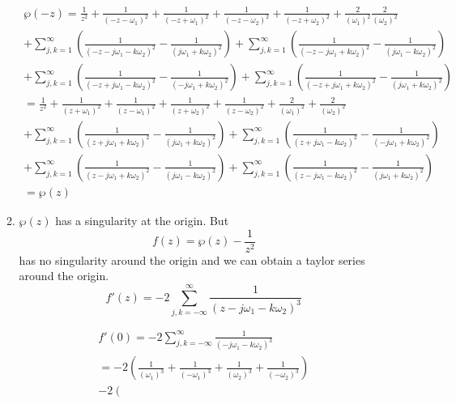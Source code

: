 \documentclass[a4paper]{article}
\begin{document}
\begin{enumerate}
\begin{enumerate}
		                         	\begin{center}             
                \begin{gather*}
   \wp(-z)		=\frac{1}{z^2}+ \frac{1}{(-z- \omega_1)^2}+ \frac{1}{(-z+ \omega_1)^2}+ \frac{1}{(-z- \omega_2)^2}+ \frac{1}{(-z+ \omega_2)^2}+ \frac{2}{( \omega_1)^2} \frac{2}{(\omega_2)^2}
		\\+\sum_{j,k=1}^\infty \left(\frac{1}{(-z-j
			\omega_1-k \omega_2)^2}-\frac{1}{(j \omega_1+k \omega_2)^2}\right)		+ \sum_{j,k=1}^{\infty} \left(\frac{1}{(-z-j
			\omega_1+k \omega_2)^2}-\frac{1}{(j \omega_1-k \omega_2)^2}\right)	
		\\+\sum_{j,k=1}^\infty \left(\frac{1}{(-z+j
			\omega_1-k \omega_2)^2}-\frac{1}{(-j \omega_1+k \omega_2)^2}\right)		+ \sum_{j,k=1}^{\infty} \left(\frac{1}{(-z+j
			\omega_1+k \omega_2)^2}-\frac{1}{(j \omega_1+k \omega_2)^2}\right)		
		\\	=\frac{1}{z^2}+ \frac{1}{(z+ \omega_1)^2}+ \frac{1}{(z- \omega_1)^2}+ \frac{1}{(z+ \omega_2)^2}+ \frac{1}{(z- \omega_2)^2}+ \frac{2}{( \omega_1)^2} + \frac{2}{(\omega_2)^2}
		\\+\sum_{j,k=1}^\infty \left(\frac{1}{(z+j
			\omega_1+k \omega_2)^2}-\frac{1}{(j \omega_1+k \omega_2)^2}\right)		+ \sum_{j,k=1}^{\infty} \left(\frac{1}{(z+j
			\omega_1-k \omega_2)^2}-\frac{1}{(-j \omega_1+k \omega_2)^2}\right)	
		\\+\sum_{j,k=1}^\infty \left(\frac{1}{(z-j
			\omega_1+k \omega_2)^2}-\frac{1}{(j \omega_1-k \omega_2)^2}\right)		+ \sum_{j,k=1}^{\infty} \left(\frac{1}{(z-j
			\omega_1-k \omega_2)^2}-\frac{1}{(j \omega_1+k \omega_2)^2}\right)	
		\\	=	   \wp(z)	
				\end{gather*} 
				\end{center}
	\item 
	$\wp(z)$ has a singularity at the origin. But
	\[ f(z) =\wp(z) - \frac{1}{z^2}	
	\] has no singularity around the origin and we can obtain a taylor series around the origin.
	\[ f'(z)= -2 \sum_{j,k=-\infty}^\infty \frac{1}{(z-j
		\omega_1-k \omega_2)^3} \]
		                         	\begin{center}             
		                         		\begin{gather*}
      f'(0)= -2  \sum_{j,k=-\infty}^\infty \frac{1}{(-j
		\omega_1-k \omega_2)^3} \\= -2 \left(\frac{1}{(\omega_1)^3}+ \frac{1}{(- \omega_1)^3}+ \frac{1}{( \omega_2)^3}+ \frac{1}{(- \omega_2)^3} \right)\\ -2\left(

\end{gather*}
\end{center}
\end{enumerate}
\end{enumerate}
\end{document}
